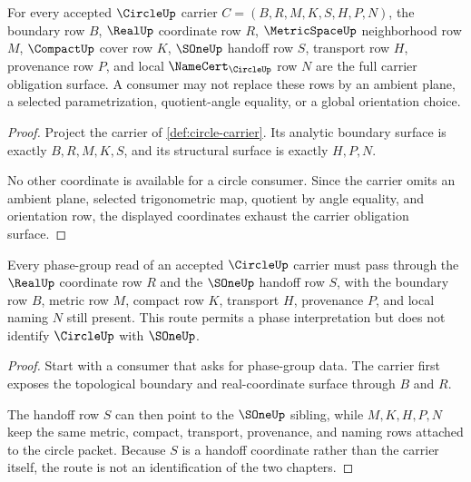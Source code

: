 \begin{theorem}
\label{thm:circle-metric-subspace-carrier-obligation}
For every accepted $\CircleUp$ carrier $C=(B,R,M,K,S,H,P,N)$, the boundary row $B$, $\RealUp$ coordinate row $R$, $\MetricSpaceUp$ neighborhood row $M$, $\CompactUp$ cover row $K$, $\SOneUp$ handoff row $S$, transport row $H$, provenance row $P$, and local $\NameCert_{\CircleUp}$ row $N$ are the full carrier obligation surface. A consumer may not replace these rows by an ambient plane, a selected parametrization, quotient-angle equality, or a global orientation choice.
\end{theorem}
\begin{proof}
Project the carrier of \autoref{def:circle-carrier}. Its analytic boundary surface is exactly $B,R,M,K,S$, and its structural surface is exactly $H,P,N$.

No other coordinate is available for a circle consumer. Since the carrier omits an ambient plane, selected trigonometric map, quotient by angle equality, and orientation row, the displayed coordinates exhaust the carrier obligation surface.
\end{proof}

\begin{theorem}
\label{thm:circle-sone-real-seal-route}
Every phase-group read of an accepted $\CircleUp$ carrier must pass through the $\RealUp$ coordinate row $R$ and the $\SOneUp$ handoff row $S$, with the boundary row $B$, metric row $M$, compact row $K$, transport $H$, provenance $P$, and local naming $N$ still present. This route permits a phase interpretation but does not identify $\CircleUp$ with $\SOneUp$.
\end{theorem}
\begin{proof}
Start with a consumer that asks for phase-group data. The carrier first exposes the topological boundary and real-coordinate surface through $B$ and $R$.

The handoff row $S$ can then point to the $\SOneUp$ sibling, while $M,K,H,P,N$ keep the same metric, compact, transport, provenance, and naming rows attached to the circle packet. Because $S$ is a handoff coordinate rather than the carrier itself, the route is not an identification of the two chapters.
\end{proof}

